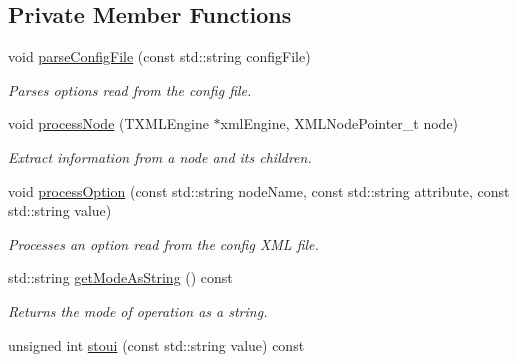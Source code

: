 \subsection*{Private Member Functions}
\begin{DoxyCompactItemize}
\item 
void \hyperlink{class_config_a3092a6e3ba0458b6bedca09f841f554e}{parse\+Config\+File} (const std\+::string config\+File)
\begin{DoxyCompactList}\small\item\em Parses options read from the config file. \end{DoxyCompactList}\item 
void \hyperlink{class_config_a46d81f90a7b6218385e8bfd0a283f6ce}{process\+Node} (T\+X\+M\+L\+Engine $\ast$xml\+Engine, X\+M\+L\+Node\+Pointer\+\_\+t node)
\begin{DoxyCompactList}\small\item\em Extract information from a node and its children. \end{DoxyCompactList}\item 
void \hyperlink{class_config_a5f1048494003d7deb4edd9064fc6e9c5}{process\+Option} (const std\+::string node\+Name, const std\+::string attribute, const std\+::string value)
\begin{DoxyCompactList}\small\item\em Processes an option read from the config X\+ML file. \end{DoxyCompactList}\item 
std\+::string \hyperlink{class_config_a3bd48a0ae54bfd982c02564160d6762b}{get\+Mode\+As\+String} () const
\begin{DoxyCompactList}\small\item\em Returns the mode of operation as a string. \end{DoxyCompactList}\item 
unsigned int \hyperlink{class_config_ad305a1492600c9864697562038f2b109}{stoui} (const std\+::string value) const
\end{DoxyCompactItemize}
